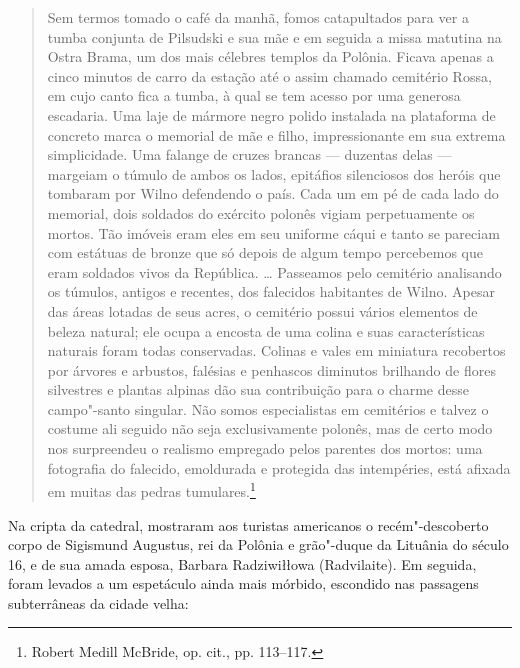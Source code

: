 \begin{quote}
Sem termos tomado o café da manhã, fomos catapultados para ver a tumba
conjunta de Pilsudski e sua mãe e em seguida a missa matutina na Ostra
Brama, um dos mais célebres templos da Polônia. Ficava apenas a cinco
minutos de carro da estação até o assim chamado cemitério Rossa, em cujo
canto fica a tumba, à qual se tem acesso por uma generosa escadaria. Uma
laje de mármore negro polido instalada na plataforma de concreto marca o
memorial de mãe e filho, impressionante em sua extrema simplicidade. Uma
falange de cruzes brancas --- duzentas delas --- margeiam o túmulo de ambos
os lados, epitáfios silenciosos dos heróis que tombaram por Wilno
defendendo o país. Cada um em pé de cada lado do memorial, dois soldados
do exército polonês vigiam perpetuamente os mortos. Tão imóveis eram
eles em seu uniforme cáqui e tanto se pareciam com estátuas de bronze
que só depois de algum tempo percebemos que eram soldados vivos da
República. \ldots{} Passeamos pelo cemitério analisando os túmulos,
antigos e recentes, dos falecidos habitantes de Wilno. Apesar das áreas
lotadas de seus acres, o cemitério possui vários elementos de beleza
natural; ele ocupa a encosta de uma colina e suas características
naturais foram todas conservadas. Colinas e vales em miniatura
recobertos por árvores e arbustos, falésias e penhascos diminutos
brilhando de flores silvestres e plantas alpinas dão sua contribuição
para o charme desse campo"-santo singular. Não somos especialistas em
cemitérios e talvez o costume ali seguido não seja exclusivamente
polonês, mas de certo modo nos surpreendeu o realismo empregado pelos
parentes dos mortos: uma fotografia do falecido, emoldurada e protegida
das intempéries, está afixada em muitas das pedras tumulares.\footnote{Robert
  Medill McBride, op. cit., pp. 113--117.}
\end{quote}

Na cripta da catedral, mostraram aos turistas americanos o
recém"-descoberto corpo de Sigismund Augustus, rei da Polônia e
grão"-duque da Lituânia do século 16, e de sua amada esposa, Barbara
Radziwiłłowa (Radvilaite). Em seguida, foram levados a um espetáculo
ainda mais mórbido, escondido nas passagens subterrâneas da cidade
velha:

